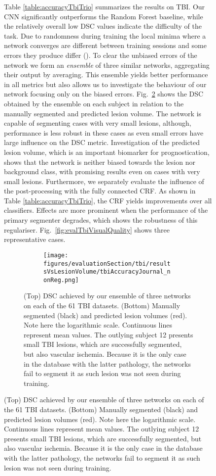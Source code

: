 \documentclass[preprint,authoryear,12pt]{elsarticle}
\begin{document}
\begin{figure}[h]
Table \ref{table:accuracyTbiTrio} summarizes the results on TBI. Our CNN significantly outperforms the Random Forest baseline, while the relatively overall low DSC values indicate the difficulty of the task.  Due to randomness during training the local minima where a network converges are different between training sessions and some errors they produce differ (\cite{Choromanska2015}). To clear the unbiased errors of the network we form an \textit{ensemble} of three similar networks, aggregating their output by averaging. This ensemble yields better performance in all metrics but also allows us to investigate the behaviour of our network focusing only on the biased errors. Fig.~\ref{fig:evalTbiAccVsVol} shows the DSC obtained by the ensemble on each subject in relation to the manually segmented and predicted lesion volume. The network is capable of segmenting cases with very small lesions, although, performance is less robust in these cases as even small errors have large influence on the DSC metric. Investigation of the predicted lesion volume, which is an important biomarker for prognostication, shows that the network is neither biased towards the lesion nor background class, with promising results even on cases with very small lesions. Furthermore, we separately evaluate the influence of the post-processing with the fully connected CRF. As shown in Table \ref{table:accuracyTbiTrio}, the CRF yields improvements over all classifiers. Effects are more prominent when the performance of the primary segmenter degrades, which shows the robustness of this regulariser. Fig.~\ref{fig:evalTbiVisualQuality} shows three representative cases.



\begin{figure}[!ht]
\centering
\begin{subfigure}[b]{1.0\textwidth}
	\centering
\texttt{[image: figures/evaluationSection/tbi/resultsVsLesionVolume/tbiAccuracyJournal\_nonReg.png]}
\end{subfigure}
\vspace{-0pt} \caption{(Top) DSC achieved by our ensemble of three networks on each of the 61 TBI datasets. (Bottom) Manually segmented (black) and predicted lesion volumes (red). Note here the logarithmic scale. Continuous lines represent mean values. The outlying subject 12 presents small TBI lesions, which are successfully segmented, but also vascular ischemia. Because it is the only case in the database with the latter pathology, the networks fail to segment it as such lesion was not seen during training.}
\label{fig:evalTbiAccVsVol}
\vspace{-10pt}
\end{figure}
%
 

\end{figure}
\end{document}

